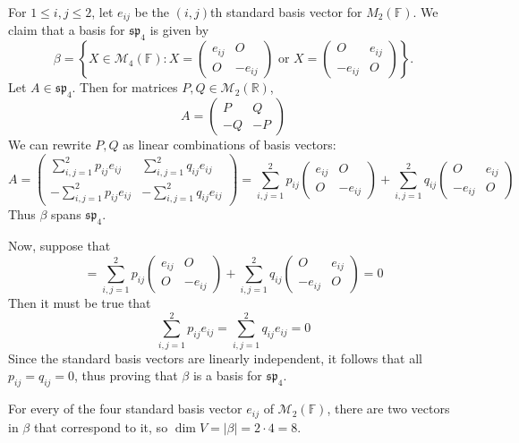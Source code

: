 \documentclass{article}
\theoremstyle{plain} %
\numberwithin{thm}{section} %
\theoremstyle{definition}
\begin{document}
\begin{question}{10}
        For \(1 \leq i,j \leq 2\), let \(e_{ij}\) be the \((i,j)\)th standard basis vector for \(M_2(\mathbb{F})\). We claim that a basis for \(\mathfrak{sp}_4\) is given by
        \[
            \beta = \left\{ X \in \mathcal{M}_4(\mathbb{F}) : X = \left( \begin{array}{c|c} e_{ij} & O \\ \hline O & -e_{ij} \end{array} \right) \text{ or } X = \left( \begin{array}{c|c} O & e_{ij} \\ \hline -e_{ij} & O \end{array} \right)\right\}.
        \]
        Let \(A \in \mathfrak{sp}_4\). Then for matrices \(P,Q \in \mathcal{M} _2(\mathbb{R})\),
        \[
            A = \left( \begin{array}{c|c} P & Q \\ \hline -Q & -P \end{array} \right)
        \]
        We can rewrite \(P,Q\) as linear combinations of basis vectors:
        \[
            A = \left( \begin{array}{c|c} \sum\limits_{i,j=1}^{2} p_{ij} e_{ij} & \sum\limits_{i,j=1}^{2} q_{ij} e_{ij} \\ \hline -\sum\limits_{i,j=1}^{2} p_{ij} e_{ij} & -\sum\limits_{i,j=1}^{2} q_{ij} e_{ij}\end{array}\right) = \sum_{i,j=1}^{2} p_{ij} \left( \begin{array}{c|c} e_{ij} & O \\ \hline O & -e_{ij} \end{array} \right) + \sum_{i,j=1}^{2} q_{ij} \left( \begin{array}{c|c} O & e_{ij} \\ \hline -e_{ij} & O \end{array} \right)
        \]
        Thus \(\beta\) spans \(\mathfrak{sp}_4\).

        Now, suppose that
        \[
            = \sum_{i,j=1}^{2} p_{ij} \left( \begin{array}{c|c} e_{ij} & O \\ \hline O & -e_{ij} \end{array} \right) + \sum_{i,j=1}^{2} q_{ij} \left( \begin{array}{c|c} O & e_{ij} \\ \hline -e_{ij} & O \end{array} \right) = 0
        \]
        Then it must be true that
        \[
            \sum_{i,j=1}^{2} p_{ij} e_{ij} = \sum_{i,j=1}^{2} q_{ij} e_{ij} = 0
        \]
        Since the standard basis vectors are linearly independent, it follows that all \(p_{ij} = q_{ij} = 0\), thus proving that \(\beta\) is a basis for \(\mathfrak{sp}_4\).

        For every of the four standard basis vector \(e_{ij}\) of \(\mathcal{M} _2(\mathbb{F})\), there are two vectors in \(\beta\) that correspond to it, so \(\dim V = |\beta | = 2\cdot 4 = 8\).
    \end{question}
\end{document}
